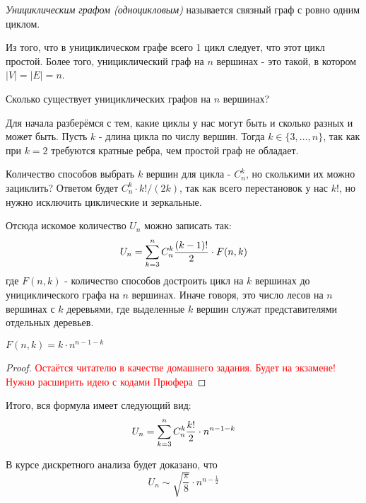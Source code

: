 \begin{definition}
	\textit{Унициклическим графом (одноцикловым)} называется связный граф с ровно одним циклом.
\end{definition}

\begin{note}
	Из того, что в унициклическом графе всего 1 цикл следует, что этот цикл простой. Более того, унициклический граф на $n$ вершинах - это такой, в котором $|V| = |E| = n$.
\end{note}

\begin{example}
	Сколько существует унициклических графов на $n$ вершинах?
\end{example}

\begin{solution}
	Для начала разберёмся с тем, какие циклы у нас могут быть и сколько разных и может быть. Пусть $k$ - длина цикла по числу вершин. Тогда $k \in \{3, \ldots, n\}$, так как при $k = 2$ требуются кратные ребра, чем простой граф не обладает.
	
	Количество способов выбрать $k$ вершин для цикла - $C_n^k$, но сколькими их можно зациклить? Ответом будет $C_n^k \cdot k! / (2k)$, так как всего перестановок у нас $k!$, но нужно исключить циклические и зеркальные.
	
	Отсюда искомое количество $U_n$ можно записать так:
	\[
		U_n = \sum\limits_{k = 3}^n C_n^k \frac{(k - 1)!}{2} \cdot F(n, k)
	\]
	где $F(n, k)$ - количество способов достроить цикл на $k$ вершинах до унициклического графа на $n$ вершинах. Иначе говоря, это число лесов на $n$ вершинах с $k$ деревьями, где выделенные $k$ вершин служат представителями отдельных деревьев.
	
	\begin{theorem}
		$F(n, k) = k \cdot n^{n - 1 - k}$
	\end{theorem}

	\begin{proof}
		\textcolor{red}{Остаётся читателю в качестве домашнего задания. Будет на экзамене! Нужно расширить идею с кодами Прюфера}
	\end{proof}

	Итого, вся формула имеет следующий вид:
	\[
		U_n = \sum\limits_{k = 3}^n C_n^k \frac{k!}{2} \cdot n^{n - 1 - k}
	\]
\end{solution}

\begin{corollary}
	В курсе дискретного анализа будет доказано, что
	\[
		U_n \sim \sqrt{\frac{\pi}{8}} \cdot n^{n - \frac{1}{2}}
	\]
\end{corollary}

